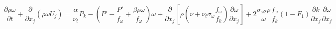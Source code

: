 \begin{equation}
\frac{\partial \rho \omega}{\partial t} + \frac{\partial}{\partial x_j} \left(\rho \omega U_j \right) = \frac{\alpha}{\nu_t} P_k - \left(P' - \frac{P'}{f_{\omega}} + \frac{\beta \rho \omega}{f_{\omega}}\right) \omega + \frac{\partial}{\partial x_j} \left[ \rho\left(\nu + \nu_t \sigma_{\omega} \frac{f_{\omega}}{f_k} \right) \frac{\partial \omega}{\partial x_j}\right] + 2 \frac{\sigma_{\omega2} \rho}{\omega} \frac{f_{\omega}}{f_k} (1-F_1) \frac{\partial k}{\partial x_j} \frac{\partial \omega}{\partial x_j}
\end{equation}


